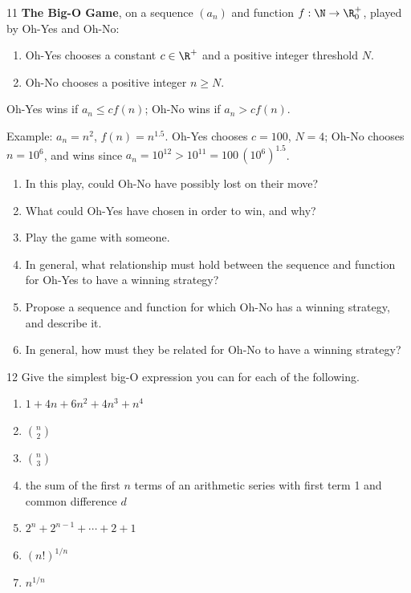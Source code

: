 \begin{exercise}{11}
    \textbf{The Big-O Game}, on a sequence $(a_n)$ and function
    $f:\N\to\R_0^+$, played by Oh-Yes and Oh-No:
    \begin{enumerate}[label=\arabic*.]
        \item Oh-Yes chooses a constant $c\in\R^+$ and a positive integer
              threshold $N$.
        \item Oh-No chooses a positive integer $n\ge N$.
    \end{enumerate}
    Oh-Yes wins if $a_n\le c f(n)$; Oh-No wins if $a_n>cf(n)$.

    Example: $a_n=n^2$, $f(n)=n^{1.5}$. Oh-Yes chooses $c=100$, $N=4$; Oh-No
    chooses $n=10^6$, and wins since $a_n=10^{12}>10^{11}=100\,(10^6)^{1.5}$.
    \begin{enumerate}[label=(\alph*)]
        \item In this play, could Oh-No have possibly lost on their move?
        \item What could Oh-Yes have chosen in order to win, and why?
        \item Play the game with someone.
        \item In general, what relationship must hold between the sequence and
              function for Oh-Yes to have a winning strategy?
        \item Propose a sequence and function for which Oh-No has a winning
              strategy, and describe it.
        \item In general, how must they be related for Oh-No to have a winning
              strategy?
    \end{enumerate}
\end{exercise}

\begin{exercise}{12}
    Give the simplest big-O expression you can for each of the following.
    \begin{enumerate}[label=(\alph*)]
        \item $1+4n+6n^2+4n^3+n^4$
        \item $\binom n2$
        \item $\binom n3$
        \item the sum of the first $n$ terms of an arithmetic series with first
              term 1 and common difference $d$
        \item $2^n+2^{n-1}+\cdots+2+1$
        \item $(n!)^{1/n}$
        \item $n^{1/n}$
    \end{enumerate}
\end{exercise}

